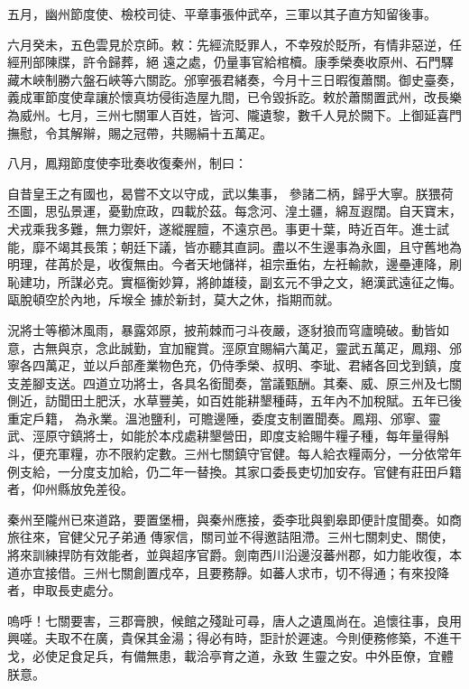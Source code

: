 \begin{pinyinscope}
 五月，幽州節度使、檢校司徒、平章事張仲武卒，三軍以其子直方知留後事。



 六月癸未，五色雲見於京師。敕：先經流貶罪人，不幸歿於貶所，有情非惡逆，任經刑部陳牒，許令歸葬，絕
 遠之處，仍量事官給棺櫝。康季榮奏收原州、石門驛藏木峽制勝六盤石峽等六關訖。邠寧張君緒奏，今月十三日暇復蕭關。御史臺奏，義成軍節度使韋讓於懷真坊侵街造屋九間，已令毀拆訖。敕於蕭關置武州，改長樂為威州。七月，三州七關軍人百姓，皆河、隴遺黎，數千人見於闕下。上御延喜門撫慰，令其解辮，賜之冠帶，共賜絹十五萬疋。



 八月，鳳翔節度使李玭奏收復秦州，制曰：



 自昔皇王之有國也，曷嘗不文以守成，武以集事，
 參諸二柄，歸乎大寧。朕猥荷丕圖，思弘景運，憂勤庶政，四載於茲。每念河、湟土疆，綿亙遐闊。自天寶末，犬戎乘我多難，無力禦奸，遂縱腥膻，不遠京邑。事更十葉，時近百年。進士試能，靡不竭其長策；朝廷下議，皆亦聽其直詞。盡以不生邊事為永圖，且守舊地為明理，荏苒於是，收復無由。今者天地儲祥，祖宗垂佑，左衽輸款，邊壘連降，刷恥建功，所謀必克。實樞衡妙算，將帥雄稜，副玄元不爭之文，絕漢武遠征之悔。甌脫頓空於內地，斥堠全
 據於新封，莫大之休，指期而就。



 況將士等櫛沐風雨，暴露郊原，披荊棘而刁斗夜嚴，逐豺狼而穹廬曉破。動皆如意，古無與京，念此誠勤，宜加寵賞。涇原宜賜絹六萬疋，靈武五萬疋，鳳翔、邠寧各四萬疋，並以戶部產業物色充，仍侍季榮、叔明、李玼、君緒各回戈到鎮，度支差腳支送。四道立功將士，各具名銜聞奏，當議甄酬。其秦、威、原三州及七關側近，訪聞田土肥沃，水草豐美，如百姓能耕墾種蒔，五年內不加稅賦。五年已後重定戶籍，
 為永業。溫池鹽利，可贍邊陲，委度支制置聞奏。鳳翔、邠寧、靈武、涇原守鎮將士，如能於本戍處耕墾營田，即度支給賜牛糧子種，每年量得斛斗，便充軍糧，亦不限約定數。三州七關鎮守官健。每人給衣糧兩分，一分依常年例支給，一分度支加給，仍二年一替換。其家口委長吏切加安存。官健有莊田戶籍者，仰州縣放免差役。



 秦州至隴州已來道路，要置堡柵，與秦州應接，委李玭與劉皋即便計度聞奏。如商旅往來，官健父兄子弟通
 傳家信，關司並不得邀詰阻滯。三州七關刺史、關使，將來訓練捍防有效能者，並與超序官爵。劍南西川沿邊沒蕃州郡，如力能收復，本道亦宜接借。三州七關創置戍卒，且要務靜。如蕃人求市，切不得通；有來投降者，申取長吏處分。



 嗚呼！七關要害，三郡膏腴，候館之殘趾可尋，唐人之遺風尚在。追懷往事，良用興嗟。夫取不在廣，貴保其金湯；得必有時，詎計於遲速。今則便務修築，不進干戈，必使足食足兵，有備無患，載洽亭育之道，永致
 生靈之安。中外臣僚，宜體朕意。




\end{pinyinscope}
